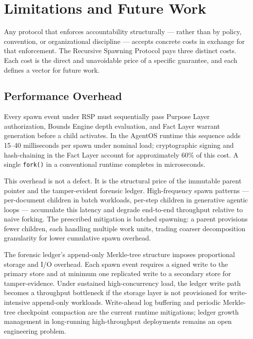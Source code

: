 \section{Limitations and Future Work}
\label{sec:rs-limitations}

Any protocol that enforces accountability structurally — rather than by policy, convention, or organizational discipline — accepts concrete costs in exchange for that enforcement. The Recursive Spawning Protocol pays three distinct costs. Each cost is the direct and unavoidable price of a specific guarantee, and each defines a vector for future work.

\subsection{Performance Overhead}
\label{sec:rs-perf-overhead}

Every spawn event under RSP must sequentially pass Purpose Layer authorization, Bounds Engine depth evaluation, and Fact Layer warrant generation before a child activates. In the AgentOS runtime this sequence adds \numrange{15}{40} milliseconds per spawn under nominal load; cryptographic signing and hash-chaining in the Fact Layer account for approximately 60\% of this cost. A single \texttt{fork()} in a conventional runtime completes in microseconds.

This overhead is not a defect. It is the structural price of the immutable parent pointer and the tamper-evident forensic ledger. High-frequency spawn patterns — per-document children in batch workloads, per-step children in generative agentic loops — accumulate this latency and degrade end-to-end throughput relative to naive forking. The prescribed mitigation is batched spawning: a parent provisions fewer children, each handling multiple work units, trading coarser decomposition granularity for lower cumulative spawn overhead.

The forensic ledger's append-only Merkle-tree structure imposes proportional storage and I/O overhead. Each spawn event requires a signed write to the primary store and at minimum one replicated write to a secondary store for tamper-evidence. Under sustained high-concurrency load, the ledger write path becomes a throughput bottleneck if the storage layer is not provisioned for write-intensive append-only workloads. Write-ahead log buffering and periodic Merkle-tree checkpoint compaction are the current runtime mitigations; ledger growth management in long-running high-throughput deployments remains an open engineering problem.

